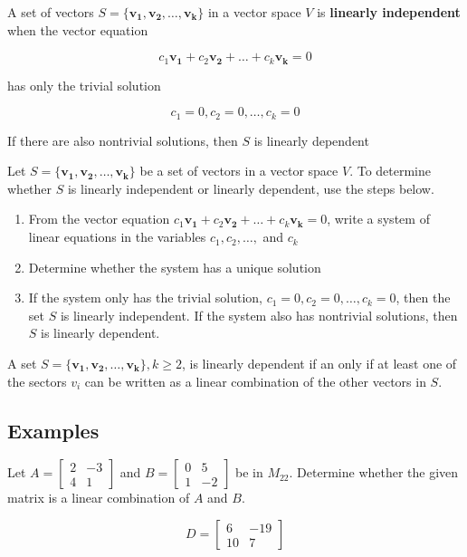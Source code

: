 \documentclass{report}
\begin{document}
\begin{tcolorbox}[title = Definition of Linear Dependence and Linear Independence]
		A set of vectors $S = \{ \bm{v_1}, \bm{v_2}, \hdots, \bm{v_k} \} $ in a vector space $V$ is \textbf{linearly independent} when the vector equation
		
		$$
		c_1 \bm{v_1} + c_2 \bm{v_2} + \hdots + c_k \bm{v_k} = 0 
		$$
		
		has only the trivial solution 
		
		$$
		c_1 = 0, c_2 = 0, \hdots, c_k = 0
		$$
		
		If there are also nontrivial solutions, then $S$ is linearly dependent
\end{tcolorbox}

\begin{tcolorbox}[title = Testing for Linear Independence and Linear Dependence]
		Let $S = \{ \bm{v_1}, \bm{v_2}, \hdots, \bm{v_k} \} $ be a set of vectors in a vector space $V$. To determine whether $S$ is linearly independent or linearly dependent, use the steps below.
		
		\begin{enumerate}
				\item From the vector equation $c_1 \bm{v_1}  + c_2 \bm{v_2} + \hdots + c_k \bm{v_k} = 0$, write a system of linear equations in the variables $c_1, c_2, \hdots,$ and $c_k$
				\item Determine whether the system has a unique solution
				\item If the system only has the trivial solution, $c_1 = 0, c_2 = 0, \hdots, c_k = 0$, then the set $S$ is linearly independent. If the system also has nontrivial solutions, then $S$ is linearly dependent.
		\end{enumerate}
\end{tcolorbox}

\begin{tcolorbox}[title = A Property of Linearly Dependent Sets]
		A set $S = \{ \bm{v_1}, \bm{v_2}, \hdots, \bm{v_k} \}, k \ge 2$, is linearly dependent if an only if at least one of the sectors $v_i$ can be written as a linear combination of the other vectors in $S$. 
\end{tcolorbox}

\subsection{Examples}

\begin{tcolorbox}[colframe = lightred]
		Let $A = \begin{bmatrix} 2 & -3 \\ 4 & 1 \end{bmatrix}$ and $B = \begin{bmatrix} 0 & 5 \\ 1 & -2 \end{bmatrix}$ be in $M_{22}$. Determine whether the given matrix is a linear combination of $A$ and $B$. 
		
		$$
		D = \begin{bmatrix} 6 & -19 \\ 10 & 7 \end{bmatrix}
		$$
\end{tcolorbox}
\end{document}
